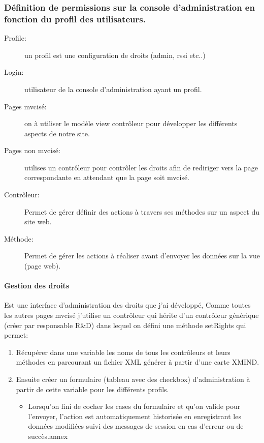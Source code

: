 \subsubsection{Définition de permissions sur la console d'administration en fonction du profil des utilisateurs.}
\begin{description}


\item[Profile:] un profil est une configuration de droits (admin, rssi etc..)

\item[Login:] utilisateur de la console d’administration ayant un profil.

\item[Pages mvcisé:] on à utiliser le modèle view contrôleur pour développer les différents aspects de notre site.

\item[Pages non mvcisé:] utilises un contrôleur pour contrôler les droits afin de rediriger vers la page correspondante en attendant que la page soit mvcisé.

\item[Contrôleur:] Permet de gérer définir des actions à travers ses méthodes sur un aspect du site web.

\item[Méthode:] Permet de gérer les actions à réaliser avant d'envoyer les données sur la vue (page web).
\end{description}

\paragraph{Gestion des droits}
Est une interface d'administration des droits que j'ai développé,
Comme toutes les autres pages mvcisé j'utilise un contrôleur qui hérite d'un contrôleur générique (créer par responsable R\&D) dans lequel on défini une méthode setRights qui permet:
\begin{enumerate}


\item Récupérer dans une variable les noms de tous les contrôleurs et leurs méthodes en parcourant un fichier XML générer à partir d'une carte XMIND.
\item Ensuite créer un formulaire (tableau avec des checkbox) d'administration à partir de cette variable pour les différents profils.
	\begin{itemize}
	\item Lorsqu'on fini de cocher les cases du formulaire et qu'on valide pour l'envoyer, l'action est automatiquement historisée en enregistrant les données modifiées suivi des messages de session en cas d'erreur ou de succès.\label{annexe1}annex
	\end{itemize}
\end{enumerate}
